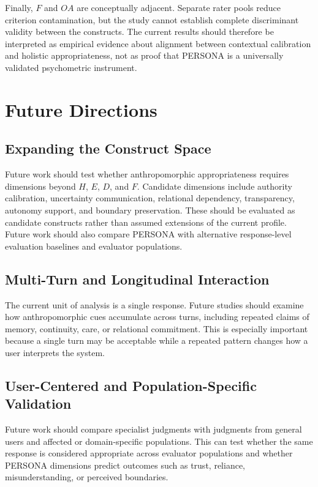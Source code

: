 \documentclass[manuscript,review,anonymous]{acmart}
\begin{document}
Finally, $F$ and $OA$ are conceptually adjacent. Separate rater pools reduce criterion contamination, but the study cannot establish complete discriminant validity between the constructs. The current results should therefore be interpreted as empirical evidence about alignment between contextual calibration and holistic appropriateness, not as proof that PERSONA is a universally validated psychometric instrument.

\section{Future Directions}

\subsection{Expanding the Construct Space}

Future work should test whether anthropomorphic appropriateness requires dimensions beyond $H$, $E$, $D$, and $F$. Candidate dimensions include authority calibration, uncertainty communication, relational dependency, transparency, autonomy support, and boundary preservation. These should be evaluated as candidate constructs rather than assumed extensions of the current profile. Future work should also compare PERSONA with alternative response-level evaluation baselines and evaluator populations.

\subsection{Multi-Turn and Longitudinal Interaction}

The current unit of analysis is a single response. Future studies should examine how anthropomorphic cues accumulate across turns, including repeated claims of memory, continuity, care, or relational commitment. This is especially important because a single turn may be acceptable while a repeated pattern changes how a user interprets the system.

\subsection{User-Centered and Population-Specific Validation}

Future work should compare specialist judgments with judgments from general users and affected or domain-specific populations. This can test whether the same response is considered appropriate across evaluator populations and whether PERSONA dimensions predict outcomes such as trust, reliance, misunderstanding, or perceived boundaries.
\end{document}
